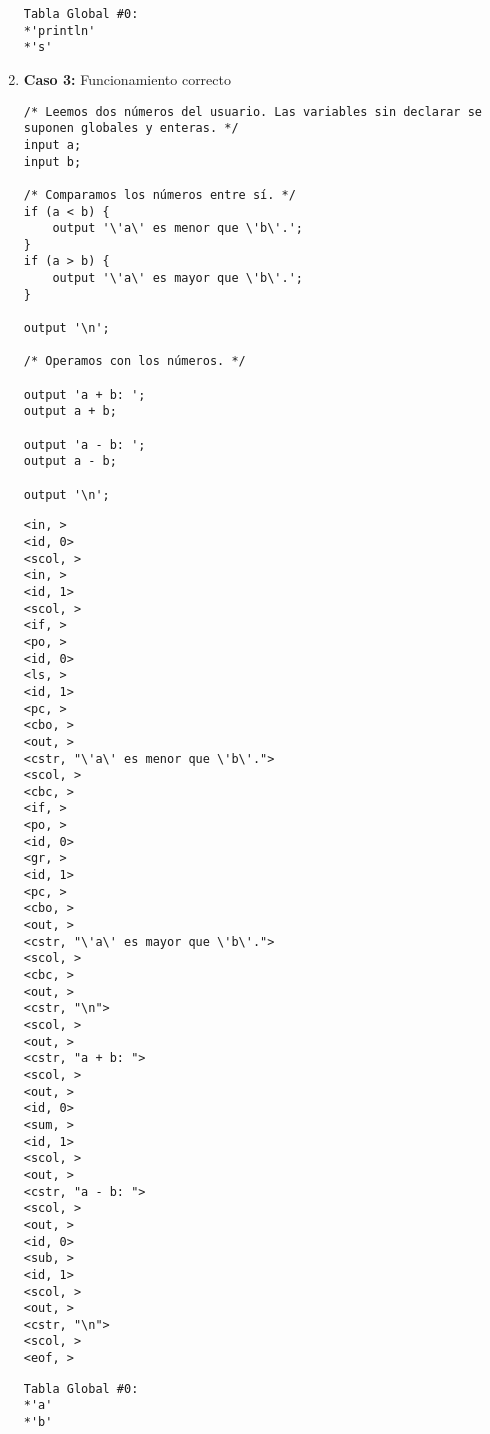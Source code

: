 \documentclass{article}
\begin{document}
\begin{enumerate}
    \begin{tcolorbox}[title={Volcado del fichero de la tabla de símbolos}, colback=white]
        \begin{lstlisting}
Tabla Global #0:
*'println'
*'s'
        \end{lstlisting}
    \end{tcolorbox}


    \item \textbf{Caso 3:} Funcionamiento correcto
    \begin{tcolorbox}[title={Código fuente}, colback=white]
        \begin{lstlisting}
/* Leemos dos números del usuario. Las variables sin declarar se suponen globales y enteras. */
input a;
input b;

/* Comparamos los números entre sí. */
if (a < b) {
    output '\'a\' es menor que \'b\'.';
}
if (a > b) {
    output '\'a\' es mayor que \'b\'.';
}

output '\n';

/* Operamos con los números. */

output 'a + b: ';
output a + b;

output 'a - b: ';
output a - b;

output '\n';
        \end{lstlisting}        
    \end{tcolorbox}

    \begin{tcolorbox}[title={Volcado del fichero de tokens}, colback=white]
        \begin{lstlisting}
<in, >
<id, 0>
<scol, >
<in, >
<id, 1>
<scol, >
<if, >
<po, >
<id, 0>
<ls, >
<id, 1>
<pc, >
<cbo, >
<out, >
<cstr, "\'a\' es menor que \'b\'.">
<scol, >
<cbc, >
<if, >
<po, >
<id, 0>
<gr, >
<id, 1>
<pc, >
<cbo, >
<out, >
<cstr, "\'a\' es mayor que \'b\'.">
<scol, >
<cbc, >
<out, >
<cstr, "\n">
<scol, >
<out, >
<cstr, "a + b: ">
<scol, >
<out, >
<id, 0>
<sum, >
<id, 1>
<scol, >
<out, >
<cstr, "a - b: ">
<scol, >
<out, >
<id, 0>
<sub, >
<id, 1>
<scol, >
<out, >
<cstr, "\n">
<scol, >
<eof, >
        \end{lstlisting}
    \end{tcolorbox}

    \begin{tcolorbox}[title={Volcado del fichero de la tabla de símbolos}, colback=white]
        \begin{lstlisting}
Tabla Global #0:
*'a'
*'b'
        \end{lstlisting}
    \end{tcolorbox}


\end{enumerate}
\end{document}
